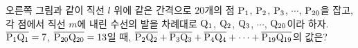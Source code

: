 \noindent\begin{minipage}[t]{0.58\linewidth}\vspace{0pt}\raggedright 오른쪽 그림과 같이 직선 $l$ 위에 같은 간격으로 $20$개의 점 $\mathrm{P_1}$, $\mathrm{P_2}$, $\mathrm{P_3}$, $\cdots$, $\mathrm{P_{20}}$을 잡고, 각 점에서 직선 $m$에 내린 수선의 발을 차례대로 $\mathrm{Q_1}$, $\mathrm{Q_2}$, $\mathrm{Q_3}$, $\cdots$, $\mathrm{Q_{20}}$이라 하자. $\overline{\mathrm{P_1Q_1}}=7$, $\overline{\mathrm{P_{20}Q_{20}}}=13$일 때, $\overline{\mathrm{P_2Q_2}}+\overline{\mathrm{P_3Q_3}}+\overline{\mathrm{P_4Q_4}}+\cdots+\overline{\mathrm{P_{19}Q_{19}}}$의 값은?\end{minipage}\hfill\begin{minipage}[t]{0.4\linewidth}\vspace{0pt}\centering \resizebox{\ifdim\width>\linewidth\linewidth\else\width\fi}{!}{}\end{minipage}\par
{}
